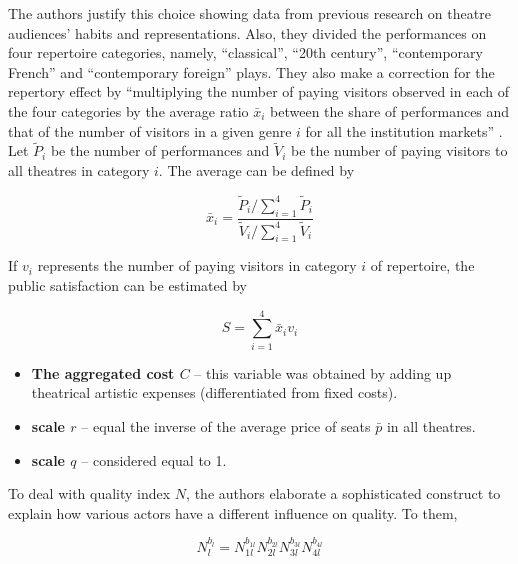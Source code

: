 \documentclass[a4paper, 12pt, openright, oneside, german, french, brazil, english, article]{abntex2}
\begin{document}
	The authors justify this choice showing data from previous research on theatre audiences' habits and representations. Also, they divided the performances on four repertoire categories, namely, ``classical'', ``20th century'', ``contemporary French'' and ``contemporary foreign'' plays. They also make a correction for the repertory effect by ``multiplying the number of paying visitors observed  in each of the four categories by the average ratio $\bar{x}_i$ between the share of performances and that of the number of visitors in a given genre $i$ for all the institution markets'' \cite[p. 265]{biencourt2002market}. Let $\tilde{P}_i$ be the number of performances and $\tilde{V}_i$ be the number of paying visitors to all theatres in category $i$. The average can be defined by
	
	\begin{equation}
	\label{repertory-effect-correction}
		\bar{x}_i = \frac{\tilde{P}_i / \sum_{i=1}^{4}\tilde{P}_i}{\tilde{V}_i / \sum_{i=1}^{4}\tilde{V}_i}	
	\end{equation}
	
	If $v_i$ represents the number of paying visitors in category $i$ of repertoire, the public satisfaction can be estimated by
	
	\begin{equation}
	\label{satisfaction-corrected}
		S = \sum_{i=1}^{4}\bar{x}_i v_i
	\end{equation}
	
	
	
	\begin{itemize}
		\item \textbf{The aggregated cost $C$} -- this variable was obtained by adding up theatrical artistic expenses (differentiated from fixed costs).
		
		\item \textbf{scale $r$} -- equal the inverse of the average price of seats $\bar{p}$ in all theatres.
		
		\item \textbf{scale $q$} -- considered equal to 1.
	\end{itemize}

	To deal with quality index $N$, the authors elaborate a sophisticated construct to explain how various actors have a different influence on quality. To them,
	
	\begin{equation}
	\label{biencourt-quality}
		N_{l}^{b_l} = N_{1l}^{b_{1l}} N_{2l}^{b_{2l}} N_{3l}^{b_{3l}} N_{4l}^{b_{4l}} 
	\end{equation}
	
\end{document}
